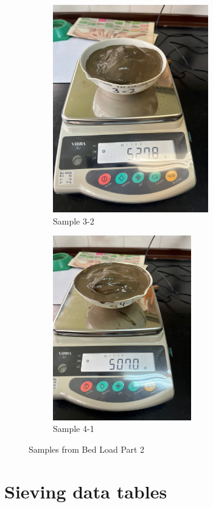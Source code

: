 \begin{figure}[H]
    \begin{subfigure}[b]{0.48\textwidth}
        \includegraphics[width=\linewidth, height =9cm]{figures/appendix-f/3-2.jpg}
        \caption{Sample 3-2}
        \label{fig:second}
    \end{subfigure}
    \hfill
    \begin{subfigure}[b]{0.48\textwidth}
        \includegraphics[width=\linewidth, height =8cm]{figures/appendix-f/4-1.jpg}
        \caption{Sample 4-1}
        \label{fig:second}
    \end{subfigure}

    \caption{Samples from Bed Load Part 2}
    \label{fig:all four 2}
\end{figure}

\section{Sieving data tables}


